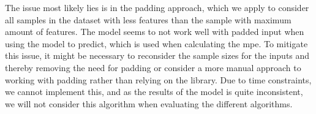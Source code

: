 The issue most likely lies is in the padding approach, which we apply to consider all samples in the dataset with less features than the sample with maximum amount of features. The model seems to not work well with padded input when using the model to predict, which is used when calculating the \gls{mpe}. To mitigate this issue, it might be necessary to reconsider the sample sizes for the inputs and thereby removing the need for padding or consider a more manual approach to working with padding rather than relying on the library. Due to time constraints, we cannot implement this, and as the results of the model is quite inconsistent, we will not consider this algorithm when evaluating the different algorithms.

